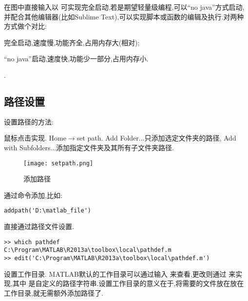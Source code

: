 在图中直接输入以  可实现完全启动.若是期望轻量级编程,可以“no java”方式启动,并配合其他编辑器(比如Sublime Text),可以实现脚本或函数的编辑及执行.对两种方式做个对比:

\begindot
  \item 完全启动,速度慢,功能齐全,占用内存大(相对);
  \item “no java”启动,速度快,功能少一部分,占用内存小.
\myenddot

.


\subsection{路径设置}
设置路径的方法:
\begindot
\item 鼠标点击实现. Home$\rightarrow$set path. Add Folder...只添加选定文件夹的路径, Add with Subfolders...添加指定文件夹及其所有子文件夹路径.

  \begin{figure}[htbp]
    \texttt{[image: setpath.png]}
    \caption{添加路径}
  \end{figure}

\item 通过命令添加,比如:

\vspace{-0.4cm}
\begin{lstlisting}
addpath('D:\matlab_file')
\end{lstlisting}

\item 直接通过路径文件设置.

\vspace{-0.4cm}
\begin{lstlisting}
>> which pathdef
C:\Program\MATLAB\R2013a\toolbox\local\pathdef.m
>> edit('C:\Program\MATLAB\R2013a\toolbox\local\pathdef.m')
\end{lstlisting}

\item 设置工作目录. MATLAB默认的工作目录可以通过输入  来查看,更改则通过  来实现,其中  是自定义的路径字符串.设置工作目录的意义在于,将需要的文件放在放在工作目录,就无需额外添加路径了.

